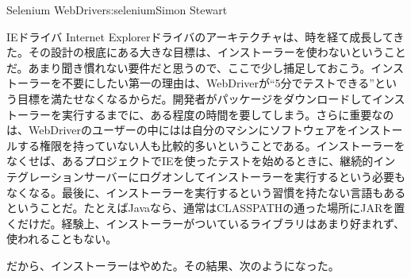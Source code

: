 \begin{aosachapter}{Selenium WebDriver}{s:selenium}{Simon Stewart}
\begin{aosasect1}{IEドライバ}
Internet Explorerドライバのアーキテクチャは、時を経て成長してきた。その設計の根底にある大きな目標は、インストーラーを使わないということだ。あまり聞き慣れない要件だと思うので、ここで少し捕足しておこう。インストーラーを不要にしたい第一の理由は、WebDriverが``5分でテストできる''という目標を満たせなくなるからだ。開発者がパッケージをダウンロードしてインストーラーを実行するまでに、ある程度の時間を要してしまう。さらに重要なのは、WebDriverのユーザーの中にはは自分のマシンにソフトウェアをインストールする権限を持っていない人も比較的多いということである。インストーラーをなくせば、あるプロジェクトでIEを使ったテストを始めるときに、継続的インテグレーションサーバーにログオンしてインストーラーを実行するという必要もなくなる。最後に、インストーラーを実行するという習慣を持たない言語もあるということだ。たとえばJavaなら、通常はCLASSPATHの通った場所にJARを置くだけだ。経験上、インストーラーがついているライブラリはあまり好まれず、使われることもない。

だから、インストーラーはやめた。その結果、次のようになった。


\end{aosasect1}
\end{aosachapter}
